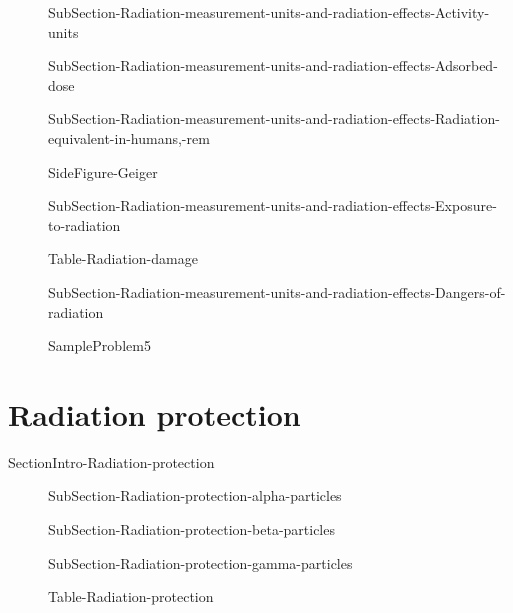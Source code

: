 \documentclass[main.tex]{subfiles}
\begin{document}
\begin{description}




\item[] 
{SubSection-Radiation-measurement-units-and-radiation-effects-Activity-units}







\item[] 
{SubSection-Radiation-measurement-units-and-radiation-effects-Adsorbed-dose}

\item[] 

{SubSection-Radiation-measurement-units-and-radiation-effects-Radiation-equivalent-in-humans,-rem}



{SideFigure-Geiger}

\item[] {SubSection-Radiation-measurement-units-and-radiation-effects-Exposure-to-radiation}

 




 

 

{Table-Radiation-damage}




\item[] 
{SubSection-Radiation-measurement-units-and-radiation-effects-Dangers-of-radiation}


  {SampleProblem5}



\end{description}



\section{Radiation protection}
{SectionIntro-Radiation-protection}



\sloppy \begin{description}

\item[] 
{SubSection-Radiation-protection-alpha-particles}

\item[] 
{SubSection-Radiation-protection-beta-particles}
\item[] 
{SubSection-Radiation-protection-gamma-particles}



 
 
{Table-Radiation-protection}
 

\end{description}
\end{document}
